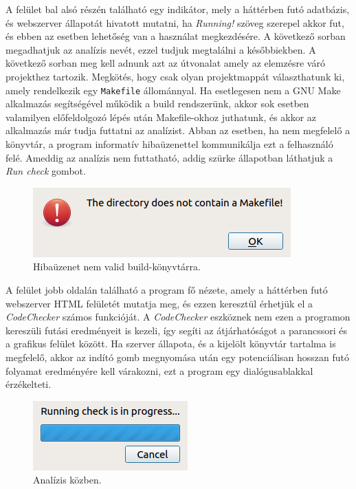 \documentclass[a4paper,12pt]{report}
\begin{document}
A felület bal alsó részén található egy indikátor, mely a háttérben futó adatbázis, és webszerver állapotát hivatott mutatni, ha \emph{Running!} szöveg szerepel akkor fut, és ebben az esetben lehetőség van a használat megkezdésére. A következő sorban megadhatjuk az analízis nevét, ezzel tudjuk megtalálni a későbbiekben. A következő sorban meg kell adnunk azt az útvonalat amely az elemzésre váró projekthez tartozik. Megkötés, hogy csak olyan projektmappát választhatunk ki, amely rendelkezik egy \texttt{Makefile} állománnyal. Ha esetlegesen nem a GNU Make alkalmazás segítségével működik a build rendszerünk, akkor sok esetben valamilyen előfeldolgozó lépés után Makefile-okhoz juthatunk, és akkor az alkalmazás már tudja futtatni az analízist. Abban az esetben, ha nem megfelelő a könyvtár, a program informatív hibaüzenettel kommunikálja ezt a felhasználó felé. Ameddig az analízis nem futtatható, addig szürke állapotban láthatjuk a \emph{Run check} gombot.


\begin{figure}[h]
\caption{Hibaüzenet nem valid build-könyvtárra.}
\centering
\includegraphics[scale=0.8]{build_dir_error.png}
\end{figure}

A felület jobb oldalán található a program fő nézete, amely a háttérben futó webszerver HTML felületét mutatja meg, és ezzen keresztül érhetjük el a \emph{CodeChecker} számos funkcióját. A \emph{CodeChecker} eszköznek nem ezen a programon kereszüli futási eredményeit is kezeli, így segíti az átjárhatóságot a parancssori és a grafikus felület között. Ha szerver állapota, és a kijelölt könyvtár tartalma is megfelelő, akkor az indító gomb megnyomása után egy potenciálisan hosszan futó folyamat eredményére kell várakozni, ezt a program egy dialógusablakkal érzékelteti.

\begin{figure}[h]
\caption{Analízis közben.}
\centering
\includegraphics[scale=0.8]{progress_bar.png}
\end{figure}
\end{document}
